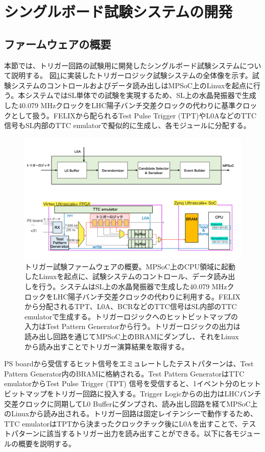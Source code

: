 \section{シングルボード試験システムの開発}
\subsection*{ファームウェアの概要}
\label{subsec_FirmwareOverview}
本節では、トリガー回路の試験用に開発したシングルボード試験システムについて説明する。
図\ref{TestSystem_Overview}に実装したトリガーロジック試験システムの全体像を示す。試験システムのコントロールおよびデータ読み出しはMPSoC上のLinuxを起点に行う。本システムではSL単体での試験を実現するため、SL上の水晶発振器で生成した40.079 MHzクロックをLHC陽子バンチ交差クロックの代わりに基準クロックとして扱う。FELIXから配られるTest Pulse Trigger (TPT)やL0AなどのTTC信号もSL内部のTTC emulatorで擬似的に生成し、各モジュールに分配する。

\begin{figure} 
\centering
\includegraphics[width=16cm]{fig/Test/TestSystem_overview.pdf}
\caption[トリガー試験ファームウェアの概要]{トリガー試験ファームウェアの概要。MPSoC上のCPU領域に起動したLinuxを起点に、試験システムのコントロール、データ読み出しを行う。システムはSL上の水晶発振器で生成した40.079 MHzクロックをLHC陽子バンチ交差クロックの代わりに利用する。FELIXから分配されるTPT、L0A、BCRなどのTTC信号はSL内部のTTC emulatorで生成する。トリガーロジックへのヒットビットマップの入力はTest Pattern Generatorから行う。トリガーロジックの出力は読み出し回路を通じてMPSoC上のBRAMにダンプし、それをLinuxから読み出すことでトリガー演算結果を取得する。}
\label{TestSystem_Overview}
\end{figure}

PS boardから受信するヒット信号をエミュレートしたテストパターンは、Test Pattern Generator内のBRAMに格納される。Test Pattern GeneratorはTTC emulatorからTest Pulse Trigger (TPT) 信号を受信すると、1イベント分のヒットビットマップをトリガー回路に投入する。Trigger Logicからの出力はLHCバンチ交差クロックに同期してL0 Bufferにダンプされ、読み出し回路を経てMPSoC上のLinuxから読み出される。トリガー回路は固定レイテンシーで動作するため、TTC emulatorはTPTから決まったクロックチック後にL0Aを出すことで、テストパターンに該当するトリガー出力を読み出すことができる。以下に各モジュールの概要を説明する。

